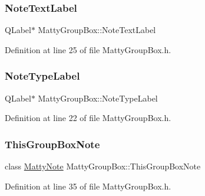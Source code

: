 \subsubsection{\texorpdfstring{Note\+Text\+Label}{NoteTextLabel}}
{\footnotesize\ttfamily Q\+Label$\ast$ Matty\+Group\+Box\+::\+Note\+Text\+Label\hspace{0.3cm}{\ttfamily [private]}}



Definition at line 25 of file Matty\+Group\+Box.\+h.

\hypertarget{classMattyGroupBox_a7bd564ef71ea2331a316d2fc6792ef09}{}\label{classMattyGroupBox_a7bd564ef71ea2331a316d2fc6792ef09} 
\subsubsection{\texorpdfstring{Note\+Type\+Label}{NoteTypeLabel}}
{\footnotesize\ttfamily Q\+Label$\ast$ Matty\+Group\+Box\+::\+Note\+Type\+Label\hspace{0.3cm}{\ttfamily [private]}}



Definition at line 22 of file Matty\+Group\+Box.\+h.

\hypertarget{classMattyGroupBox_a00ca2ef39a0b5aca9e83373777bed395}{}\label{classMattyGroupBox_a00ca2ef39a0b5aca9e83373777bed395} 
\subsubsection{\texorpdfstring{This\+Group\+Box\+Note}{ThisGroupBoxNote}}
{\footnotesize\ttfamily class \hyperlink{classMattyNote}{Matty\+Note} Matty\+Group\+Box\+::\+This\+Group\+Box\+Note\hspace{0.3cm}{\ttfamily [private]}}



Definition at line 35 of file Matty\+Group\+Box.\+h.

\hypertarget{classMattyGroupBox_a2fc280283ef68a61828fe26007c949f1}{}\label{classMattyGroupBox_a2fc280283ef68a61828fe26007c949f1} 
